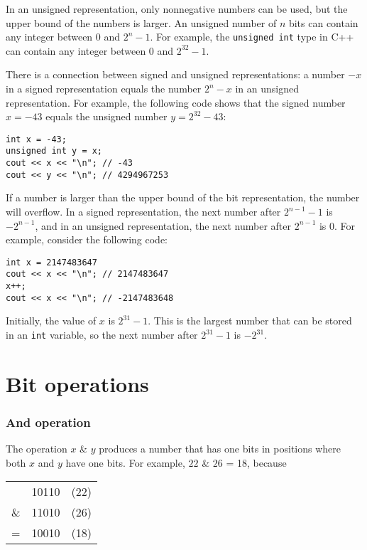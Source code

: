 In an unsigned representation, only nonnegative
numbers can be used, but the upper bound of the numbers is larger.
An unsigned number of $n$ bits can contain any
integer between $0$ and $2^n-1$.
For example, the \texttt{unsigned int} type in C++
can contain any integer between $0$ and $2^{32}-1$.

There is a connection between signed and unsigned
representations:
a number $-x$ in a signed representation
equals the number $2^n-x$ in an unsigned representation.
For example, the following code shows that
the signed number $x=-43$ equals the unsigned
number $y=2^{32}-43$:
\begin{lstlisting}
int x = -43;
unsigned int y = x;
cout << x << "\n"; // -43
cout << y << "\n"; // 4294967253
\end{lstlisting}

If a number is larger than the upper bound
of the bit representation, the number will overflow.
In a signed representation,
the next number after $2^{n-1}-1$ is $-2^{n-1}$,
and in an unsigned representation,
the next number after $2^{n-1}$ is $0$.
For example, consider the following code:
\begin{lstlisting}
int x = 2147483647
cout << x << "\n"; // 2147483647
x++;
cout << x << "\n"; // -2147483648
\end{lstlisting}

Initially, the value of $x$ is $2^{31}-1$.
This is the largest number that can be stored
in an \texttt{int} variable,
so the next number after $2^{31}-1$ is $-2^{31}$.


\section{Bit operations}

\newcommand\XOR{\mathbin{\char`\^}}

\subsubsection{And operation}


The  operation $x$ \& $y$ produces a number
that has one bits in positions where both
$x$ and $y$ have one bits.
For example, $22$ \& $26$ = 18, because

\begin{center}
\begin{tabular}{rrr}
& 10110 & (22)\\
\& & 11010 & (26) \\
\hline
 = & 10010 & (18) \\
\end{tabular}
\end{center}

